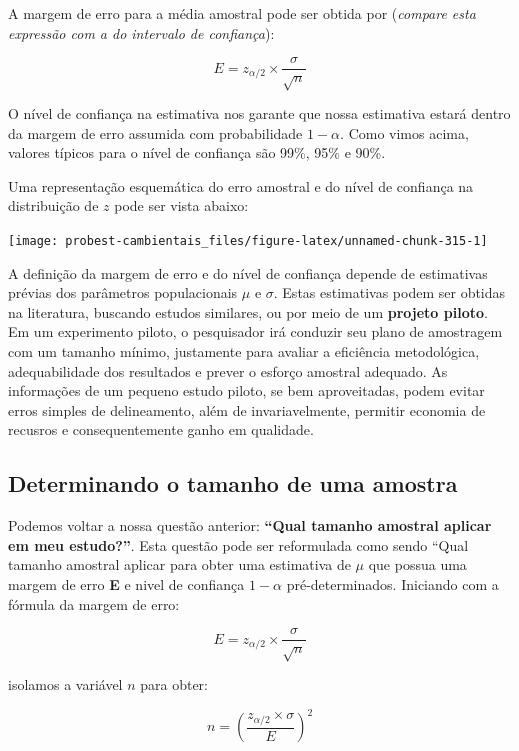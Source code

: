 \documentclass[
]{book}
\begin{document}
A margem de erro para a média amostral pode ser obtida por (\emph{compare esta expressão com a do intervalo de confiança}):

\[E = z_{\alpha/2} \times \frac{\sigma}{\sqrt{n}}\]

O nível de confiança na estimativa nos garante que nossa estimativa estará dentro da margem de erro assumida com probabilidade \(1-\alpha\). Como vimos acima, valores típicos para o nível de confiança são 99\%, 95\% e 90\%.

Uma representação esquemática do erro amostral e do nível de confiança na distribuição de \(z\) pode ser vista abaixo:

\begin{center}\texttt{[image: probest-cambientais\_files/figure-latex/unnamed-chunk-315-1]} \end{center}

A definição da margem de erro e do nível de confiança depende de estimativas prévias dos parâmetros populacionais \(\mu\) e \(\sigma\). Estas estimativas podem ser obtidas na literatura, buscando estudos similares, ou por meio de um \textbf{projeto piloto}. Em um experimento piloto, o pesquisador irá conduzir seu plano de amostragem com um tamanho mínimo, justamente para avaliar a eficiência metodológica, adequabilidade dos resultados e prever o esforço amostral adequado. As informações de um pequeno estudo piloto, se bem aproveitadas, podem evitar erros simples de delineamento, além de invariavelmente, permitir economia de recusros e consequentemente ganho em qualidade.

\hypertarget{determinando-o-tamanho-de-uma-amostra}{%
\subsection{Determinando o tamanho de uma amostra}\label{determinando-o-tamanho-de-uma-amostra}}

Podemos voltar a nossa questão anterior: \textbf{``Qual tamanho amostral aplicar em meu estudo?''}. Esta questão pode ser reformulada como sendo ``Qual tamanho amostral aplicar para obter uma estimativa de \(\mu\) que possua uma margem de erro \textbf{E} e nivel de confiança \(1-\alpha\) pré-determinados. Iniciando com a fórmula da margem de erro:

\[E = z_{\alpha/2} \times \frac{\sigma}{\sqrt{n}}\]

isolamos a variável \(n\) para obter:

\[n = (\frac{ z_{\alpha/2} \times \sigma}{E})^2\]
\end{document}
